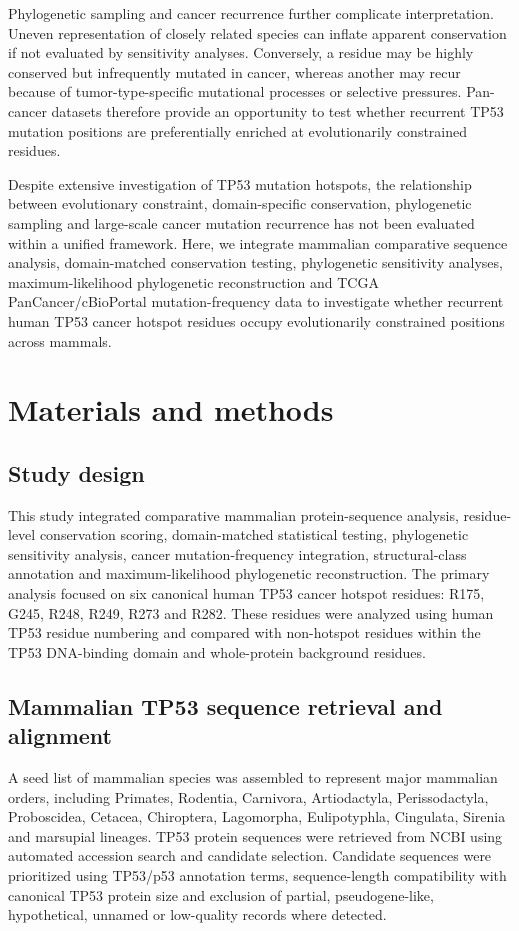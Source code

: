 \documentclass[namedate,webpdf,contemporary,large]{oup-authoring-template}
\begin{document}
Phylogenetic sampling and cancer recurrence further complicate interpretation. Uneven representation of closely related species can inflate apparent conservation if not evaluated by sensitivity analyses. Conversely, a residue may be highly conserved but infrequently mutated in cancer, whereas another may recur because of tumor-type-specific mutational processes or selective pressures. Pan-cancer datasets therefore provide an opportunity to test whether recurrent TP53 mutation positions are preferentially enriched at evolutionarily constrained residues.

Despite extensive investigation of TP53 mutation hotspots, the relationship between evolutionary constraint, domain-specific conservation, phylogenetic sampling and large-scale cancer mutation recurrence has not been evaluated within a unified framework. Here, we integrate mammalian comparative sequence analysis, domain-matched conservation testing, phylogenetic sensitivity analyses, maximum-likelihood phylogenetic reconstruction and TCGA PanCancer/cBioPortal mutation-frequency data to investigate whether recurrent human TP53 cancer hotspot residues occupy evolutionarily constrained positions across mammals.

\section{Materials and methods}
\subsection{Study design}
This study integrated comparative mammalian protein-sequence analysis, residue-level conservation scoring, domain-matched statistical testing, phylogenetic sensitivity analysis, cancer mutation-frequency integration, structural-class annotation and maximum-likelihood phylogenetic reconstruction. The primary analysis focused on six canonical human TP53 cancer hotspot residues: R175, G245, R248, R249, R273 and R282. These residues were analyzed using human TP53 residue numbering and compared with non-hotspot residues within the TP53 DNA-binding domain and whole-protein background residues.

\subsection{Mammalian TP53 sequence retrieval and alignment}
A seed list of mammalian species was assembled to represent major mammalian orders, including Primates, Rodentia, Carnivora, Artiodactyla, Perissodactyla, Proboscidea, Cetacea, Chiroptera, Lagomorpha, Eulipotyphla, Cingulata, Sirenia and marsupial lineages. TP53 protein sequences were retrieved from NCBI using automated accession search and candidate selection. Candidate sequences were prioritized using TP53/p53 annotation terms, sequence-length compatibility with canonical TP53 protein size and exclusion of partial, pseudogene-like, hypothetical, unnamed or low-quality records where detected.
\end{document}
